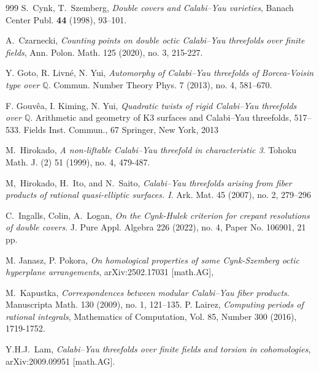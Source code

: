 \documentclass[12pt]{amsart}
\theoremstyle{plain}
\theoremstyle{remark}
\theoremstyle{definition}
\newcommand\QQ{{\mathbb Q}}
\numberwithin{table}{section}
\begin{document}
\begin{thebibliography}{999}
 S.~Cynk, T.~Szemberg, {\em Double covers and
Calabi--Yau varieties}, Banach Center Publ. {\bf 44} (1998), 93--101.


A.~Czarnecki, \emph{Counting points on double octic Calabi--Yau threefolds over finite fields}, Ann. Polon. Math. 125 (2020), no. 3, 215-227.

Y. Goto, R. Livné, N. Yui,
\emph{Automorphy of Calabi--Yau threefolds of Borcea-Voisin type over $\QQ$}.
Commun. Number Theory Phys. 7 (2013), no. 4, 581--670.

F. Gouvêa, I. Kiming, N. Yui, \emph{Quadratic twists of rigid Calabi--Yau threefolds over $\QQ$}. Arithmetic and geometry of K3 surfaces and Calabi--Yau threefolds, 517--533.
Fields Inst. Commun., 67
Springer, New York, 2013

M.~Hirokado, \emph{A non-liftable Calabi--Yau threefold in characteristic 3}. Tohoku Math. J. (2) 51
(1999), no. 4, 479-487.

M,~Hirokado, H.~Ito, and N.~Saito, \emph{Calabi--Yau threefolds arising from fiber products of rational quasi-elliptic surfaces. I}. Ark. Mat. 45 (2007), no. 2, 279--296

C.~Ingalls, Colin, A.~Logan,
\emph{On the Cynk-Hulek criterion for crepant resolutions of double covers}.
J. Pure Appl. Algebra 226 (2022), no. 4, Paper No. 106901, 21 pp.

M. Janasz, P. Pokora, \emph{On homological properties of some Cynk-Szemberg octic hyperplane arrangements}, 	arXiv:2502.17031 [math.AG],

 M.~Kapustka,  \emph{Correspondences between modular
    Calabi--Yau fiber products}. Manuscripta Math. 130 (2009), no. 1,
  121--135.
   P. Lairez, {\em Computing periods of rational integrals}, Mathematics of Computation, Vol. 85, Number 300 (2016), 1719-1752.

  Y.H.J.~Lam, \emph{Calabi--Yau threefolds over finite fields and torsion in cohomologies}, 	arXiv:2009.09951 [math.AG].


\end{thebibliography}
\end{document}
